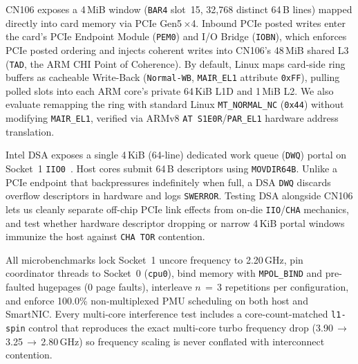 CN106 exposes a 4\,MiB window (\texttt{BAR4} slot~15, 32,768 distinct 64\,B lines) mapped directly into card memory via PCIe Gen5\,$\times$4. Inbound PCIe posted writes enter the card's PCIe Endpoint Module (\texttt{PEM0}) and I/O Bridge (\texttt{IOBN}), which enforces PCIe posted ordering and injects coherent writes into CN106's 48\,MiB shared L3 (\texttt{TAD}, the ARM CHI Point of Coherence). By default, Linux maps card-side ring buffers as cacheable Write-Back (\texttt{Normal-WB}, \texttt{MAIR\_EL1} attribute \texttt{0xFF}), pulling polled slots into each ARM core's private 64\,KiB L1D and 1\,MiB L2. We also evaluate remapping the ring with standard Linux \texttt{MT\_NORMAL\_NC} (\texttt{0x44}) without modifying \texttt{MAIR\_EL1}, verified via ARMv8 \texttt{AT S1E0R}/\texttt{PAR\_EL1} hardware address translation.

Intel DSA exposes a single 4\,KiB (64-line) dedicated work queue (\texttt{DWQ}) portal on Socket~1 \texttt{IIO0}~\cite{inteldsa2023}. Host cores submit 64\,B descriptors using \texttt{MOVDIR64B}. Unlike a PCIe endpoint that backpressures indefinitely when full, a DSA \texttt{DWQ} discards overflow descriptors in hardware and logs \texttt{SWERROR}. Testing DSA alongside CN106 lets us cleanly separate off-chip PCIe link effects from on-die \texttt{IIO}/\texttt{CHA} mechanics, and test whether hardware descriptor dropping or narrow 4\,KiB portal windows immunize the host against \texttt{CHA TOR} contention.

All microbenchmarks lock Socket~1 uncore frequency to 2.20\,GHz, pin coordinator threads to Socket~0 (\texttt{cpu0}), bind memory with \texttt{MPOL\_BIND} and pre-faulted hugepages (0 page faults), interleave $n\,=\,3$ repetitions per configuration, and enforce 100.0\% non-multiplexed PMU scheduling on both host and SmartNIC. Every multi-core interference test includes a core-count-matched \texttt{l1-spin} control that reproduces the exact multi-core turbo frequency drop (3.90\,$\to$\,3.25\,$\to$\,2.80\,GHz) so frequency scaling is never conflated with interconnect contention.
